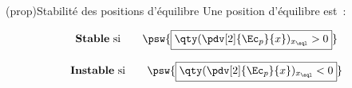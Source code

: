 \documentclass[../../main/main.tex]{subfiles}
\begin{document}
\begin{tcb*}(prop){Stabilité des positions d'équilibre}
	Une position d'équilibre est~:\\
	\begin{isd}
		\[\text{\textbf{Stable} si}
			\qquad
			\psw{\boxed{\qty(\pdv[2]{\Ec_p}{x})_{x_{\eql}} > 0}}
		\]
		\begin{center}
			\vspace{-15pt}
		\end{center}
		\tcblower
		\[\text{\textbf{Instable} si}
			\qquad
			\psw{\boxed{\qty(\pdv[2]{\Ec_p}{x})_{x_{\eql}} < 0}}
		\]
		\begin{center}
			\vspace{-15pt}
		\end{center}
	\end{isd}
\end{tcb*}
\end{document}
